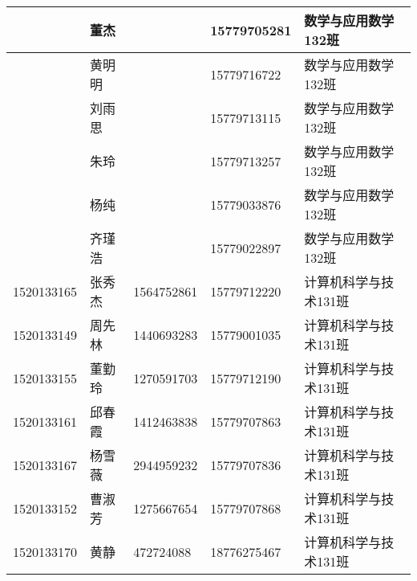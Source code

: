 \documentclass[12pt,a4paper]{article}
\begin{document}
\begin{CJK}{UTF8}{gbsn}
\begin{flushleft}
\begin{longtable}{|l|l|l|l|l|}
           & 董杰           &            & 15779705281 & 数学与应用数学132班 \\ \hline
           & 黄明明         &            & 15779716722 & 数学与应用数学132班 \\ \hline
           & 刘雨思         &            & 15779713115 & 数学与应用数学132班 \\ \hline
           & 朱玲           &            & 15779713257 & 数学与应用数学132班 \\ \hline
           & 杨纯           &            & 15779033876 & 数学与应用数学132班 \\ \hline
           & 齐瑾浩         &            & 15779022897 & 数学与应用数学132班 \\ \hline

1520133165 & 张秀杰         & 1564752861 & 15779712220 & 计算机科学与技术131班 \\ \hline
1520133149 & 周先林         & 1440693283 & 15779001035 & 计算机科学与技术131班 \\ \hline
1520133155 & 董勤玲         & 1270591703 & 15779712190 & 计算机科学与技术131班 \\ \hline
1520133161 & 邱春霞         & 1412463838 & 15779707863 & 计算机科学与技术131班 \\ \hline
1520133167 & 杨雪薇         & 2944959232 & 15779707836 & 计算机科学与技术131班 \\ \hline
1520133152 & 曹淑芳         & 1275667654 & 15779707868 & 计算机科学与技术131班 \\ \hline
1520133170 & 黄静           & 472724088  & 18776275467 & 计算机科学与技术131班 \\ \hline


\end{longtable}
\end{flushleft}
\end{CJK}
\end{document}
